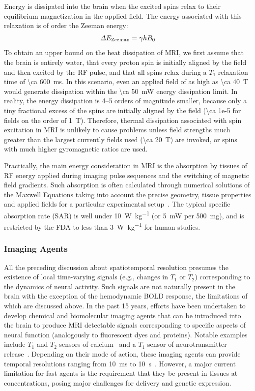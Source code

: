 Energy is dissipated into the brain when the excited spins relax to their equilibrium magnetization in the applied field.
The energy associated with this relaxation is of order the Zeeman energy:
\[\Delta E_{\text{\scriptsize Zeeman}} = \gamma h B_0\]
To obtain an upper bound on the heat dissipation of MRI, we first assume that the brain is entirely water, that every proton spin is initially aligned by the field and then excited by the RF pulse, and that all spins relax during a $T_1$ relaxation time of \SI{\ca 600}{\ms}.
In this scenario, even an applied field of as high as \SI{\ca 40}{\tesla} would generate dissipation within the \SI{\ca 50}{\milli\watt} energy dissipation limit.
In reality, the energy dissipation is 4--5 orders of magnitude smaller, because only a tiny fractional excess of the spins are initially aligned by the field (\num{\ca 1e-5} for fields on the order of \SI{1}{\tesla}).
Therefore, thermal dissipation associated with spin excitation in MRI is unlikely to cause problems unless field strengths much greater than the largest currently fields used (\SI{\ca 20}{\tesla}) are invoked, or spins with much higher gyromagnetic ratios are used.

Practically, the main energy consideration in MRI is the absorption by tissues of RF energy applied during imaging pulse sequences and the switching of magnetic field gradients.
Such absorption is often calculated through numerical solutions of the Maxwell Equations taking into account the precise geometry, tissue properties and applied fields for a particular experimental setup~\cite{collins04}.
The typical specific absorption rate (SAR) is well under \SI{10}{\watt\per\kilogram} (or \SI{5}{\milli\watt} per \SI{500}{\milli\gram}), and is restricted by the FDA to less than \SI{3}{\watt\per\kilogram} for human studies.

\subsubsection{Imaging Agents}

All the preceding discussion about spatiotemporal resolution presumes the existence of local time-varying signals (e.g., changes in $T_1$ or $T_2$) corresponding to the dynamics of neural activity.
Such signals are not naturally present in the brain with the exception of the hemodynamic BOLD response, the limitations of which are discussed above.
In the past 15 years, efforts have been undertaken to develop chemical and biomolecular imaging agents that can be introduced into the brain to produce MRI detectable signals corresponding to specific aspects of neural function (analogously to fluorescent dyes and proteins).
Notable examples include $T_1$ and $T_2$ sensors of calcium~\cite{atanasijevic06,li99} and a $T_1$ sensor of neurotransmitter release~\cite{shapiro10}.
Depending on their mode of action, these imaging agents can provide temporal resolutions ranging from \SI{10}{\milli\second} to \SI{10}{\second}~\cite{shapiro06}.
However, a major current limitation for fast agents is the requirement that they be present in tissues at \si{\micro\Molar} concentrations, posing major challenges for delivery and genetic expression.

